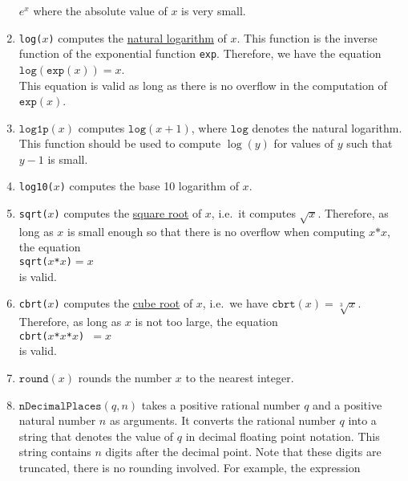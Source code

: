 \begin{enumerate}
      $e^x$ where the absolute value of $x$ is very small.
\item \texttt{log($x$)} computes the 
      \href{https://en.wikipedia.org/wiki/Natural_logarithm}{natural logarithm} of $x$.  This function is the
      inverse function of the exponential function \texttt{exp}.  Therefore, we have
      the equation
      \\[0.2cm]
      \hspace*{1.3cm}
      $\mathtt{log}(\mathtt{exp}(x)) = x$.
      \\[0.2cm]
      This equation is valid as long as there is no overflow in the computation of
      $\mathtt{exp}(x)$.
\item $\mathtt{log1p}(x)$ computes $\mathtt{log}(x + 1)$, where $\mathtt{log}$ denotes the natural
      logarithm.  This function should be used to compute $\log(y)$ for values of $y$ such that $y - 1$ is small.
\item \texttt{log10($x$)} computes the base 10 logarithm of $x$.
\item \texttt{sqrt($x$)} computes the \href{https://en.wikipedia.org/wiki/Square_root}{square root}
      of $x$, i.e.~it computes $\sqrt{x}$.  Therefore, as long as $x$ is small enough so that there
      is no overflow when computing $x\mathtt{*}x$, the equation 
      \\[0.2cm]
      \hspace*{1.3cm}
      \texttt{sqrt($x$*$x$)$=x$}
      \\[0.2cm]
      is valid.
\item \texttt{cbrt($x$)} computes the \href{https://en.wikipedia.org/wiki/Cube_root}{cube root} of
      $x$, i.e.~we have $\mathtt{cbrt}(x) = \sqrt[3]{x}$.  Therefore, as long as $x$ is not too large, the equation
      \\[0.2cm]
      \hspace*{1.3cm}
      \texttt{cbrt($x$*$x$*$x$) $= x$}
      \\[0.2cm]
      is valid.
\item $\texttt{round}(x)$ rounds the number $x$ to the nearest integer.
\item $\texttt{nDecimalPlaces}(q, n)$ takes a positive rational number $q$ and a positive natural
      number $n$ as arguments.  It converts the rational number $q$ into a string that denotes the
      value of $q$ in decimal floating point notation.  This string contains $n$ digits after the
      decimal point.  Note that these digits are truncated, there is no rounding
      involved.  For example, the expression

\end{enumerate}
